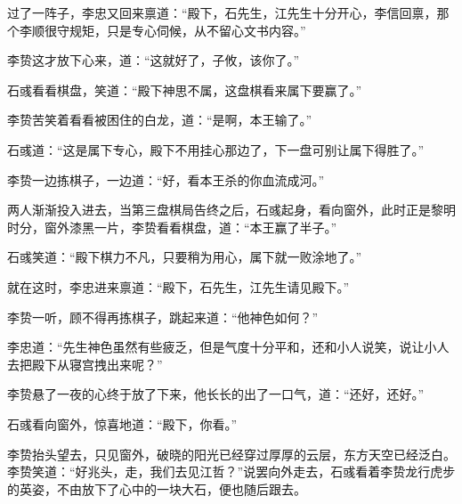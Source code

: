 过了一阵子，李忠又回来禀道：“殿下，石先生，江先生十分开心，李信回禀，那个李顺很守规矩，只是专心伺候，从不留心文书内容。”

李贽这才放下心来，道：“这就好了，子攸，该你了。”

石彧看看棋盘，笑道：“殿下神思不属，这盘棋看来属下要赢了。”

李贽苦笑着看看被困住的白龙，道：“是啊，本王输了。”

石彧道：“这是属下专心，殿下不用挂心那边了，下一盘可别让属下得胜了。”

李贽一边拣棋子，一边道：“好，看本王杀的你血流成河。”

两人渐渐投入进去，当第三盘棋局告终之后，石彧起身，看向窗外，此时正是黎明时分，窗外漆黑一片，李贽看看棋盘，道：“本王赢了半子。”

石彧笑道：“殿下棋力不凡，只要稍为用心，属下就一败涂地了。”

就在这时，李忠进来禀道：“殿下，石先生，江先生请见殿下。”

李贽一听，顾不得再拣棋子，跳起来道：“他神色如何？”

李忠道：“先生神色虽然有些疲乏，但是气度十分平和，还和小人说笑，说让小人去把殿下从寝宫拽出来呢？”

李贽悬了一夜的心终于放了下来，他长长的出了一口气，道：“还好，还好。”

石彧看向窗外，惊喜地道：“殿下，你看。”

李贽抬头望去，只见窗外，破晓的阳光已经穿过厚厚的云层，东方天空已经泛白。李贽笑道：“好兆头，走，我们去见江哲？”说罢向外走去，石彧看着李贽龙行虎步的英姿，不由放下了心中的一块大石，便也随后跟去。